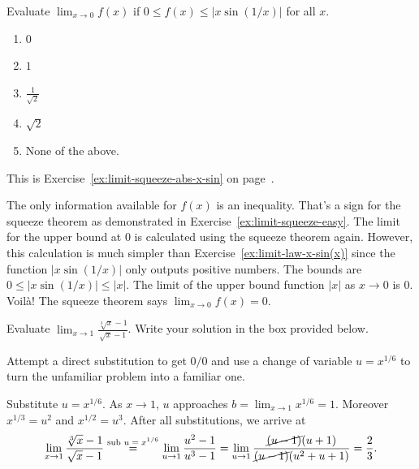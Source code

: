 \documentclass[../main.tex]{subfiles}
\begin{document}
\begin{exercise} \label{ex:midterm-practice-12}
  Evaluate \(\lim_{x \to 0} f(x)\) if \(0 \le f(x) \le |x \sin(1/x)|\) for all \(x\).
  \begin{enumerate}[label=\Alph*.]
    \item \(0\)
    \item \(1\)
    \item \(\frac{1}{\sqrt{2}}\)
    \item \(\sqrt{2}\)
    \item None of the above.
  \end{enumerate}

  \begin{hint}
    This is Exercise~\ref{ex:limit-squeeze-abs-x-sin} on page~\pageref{ex:limit-squeeze-abs-x-sin}.
  \end{hint}

  \begin{solution}
    The only information available for \(f(x)\) is an inequality.  That's a sign for the squeeze theorem as demonstrated in Exercise~\ref{ex:limit-squeeze-easy}.  The limit for the upper bound at \(0\) is calculated using the squeeze theorem again. However, this calculation is much simpler than Exercise~\ref{ex:limit-law-x-sin(x)} since the function \(|x \sin(1/x)|\) only outputs positive numbers.  The bounds are \(0 \le | x \sin(1/x)| \le |x|\). The limit of the upper bound function \(|x|\) as \(x \to 0\) is \(0\). Voil\`a! The squeeze theorem says \(\lim_{x \to 0} f(x) = 0\).
  \end{solution}
\end{exercise}
\vfill
\clearpage

\begin{exercise} \label{ex:midterm-practice-13}
  Evaluate \(\lim_{x \to 1} \frac{\sqrt[3]{x} - 1}{\sqrt{x} - 1}\).
  Write your solution in the box provided below.


  \begin{hint}
    Attempt a direct substitution to get \(0/0\) and use a change of variable \(u = x^{1/6}\) to turn the unfamiliar problem into a familiar one.
  \end{hint}

  \begin{solution}
    Substitute \(u = x^{1/6}\). As \(x \to 1\), \(u\) approaches \(b = \lim_{x \to 1} x^{1/6} = 1\). Moreover \(x^{1/3} = u^{2}\) and \(x^{1/2} = u^{3}\). 
    After all substitutions, we arrive at
    \[
      \lim_{x \to 1} \frac{\sqrt[3]{x}-1}{\sqrt{x}-1} \overset{\text{sub \(u = x^{1/6}\)}}{=} \lim_{u \to 1} \frac{u^{2} - 1}{u^{3} - 1} = \lim_{u \to 1} \frac{\cancel{(u-1)}(u+1)}{\cancel{(u-1)}(u^{2}+u+1)} = \frac{2}{3}.
    \]
  \end{solution}
\end{exercise}
\nopagebreak\vfill
\end{document}
